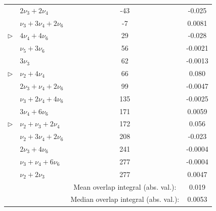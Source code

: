 \begin{table}
\begin{tabular}{llcc}
                 & $ 2 \nu_3 +  2 \nu_4$                         &   -43 & -0.025 \\
                 & $\nu_3 +  3 \nu_4 +  2 \nu_6$                 &    -7 &  0.0081 \\
$\triangleright$ & $ 4 \nu_4 +  4 \nu_6$                         &    29 & -0.028 \\
                 & $\nu_5 +  3 \nu_6$                            &    56 & -0.0021 \\
                 & $ 3 \nu_3$                                    &    62 & -0.0013 \\
$\triangleright$ & $\nu_2 +  4 \nu_4$                            &    66 &  0.080 \\
                 & $ 2 \nu_3 + \nu_4 +  2 \nu_6$                 &    99 & -0.0047 \\
                 & $\nu_3 +  2 \nu_4 +  4 \nu_6$                 &   135 & -0.0025 \\
                 & $ 3 \nu_4 +  6 \nu_6$                         &   171 &  0.0059 \\
$\triangleright$ & $\nu_2 + \nu_3 +  2 \nu_4$                    &   172 &  0.056 \\
                 & $\nu_2 +  3 \nu_4 +  2 \nu_6$                 &   208 & -0.023 \\
                 & $ 2 \nu_3 +  4 \nu_6$                         &   241 & -0.0004 \\
                 & $\nu_3 + \nu_4 +  6 \nu_6$                    &   277 & -0.0004 \\
                 & $\nu_2 +  2 \nu_3$                            &   277 &  0.0047 \\
\midrule
& & Mean overlap integral (abs. val.): & 0.019 \\
& & Median overlap integral (abs. val.): & 0.0053 \\
  \end{tabular}\\[3mm]

\end{table}

